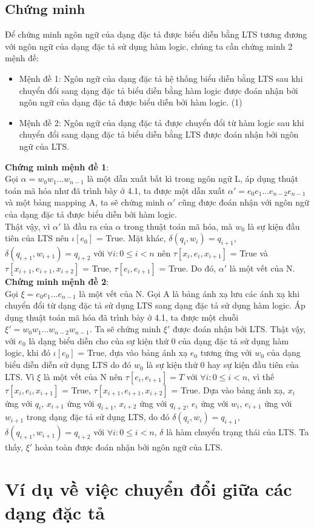 \documentclass[a4paper,13pt,oneside,openany]{book}
\begin{document}
\begin{flushleft}
		\section{Chứng minh}
		Để chứng minh ngôn ngữ của dạng đặc tả được biểu diễn bằng LTS tương đương với ngôn ngữ của dạng đặc tả sử dụng hàm logic, chúng ta cần chứng minh 2 mệnh đề:
		\begin{itemize}
			\item Mệnh đề 1: Ngôn ngữ của dạng đặc tả hệ thống biểu diễn bằng LTS sau khi chuyển đổi sang dạng đặc tả biểu diễn bằng hàm logic được đoán nhận bởi ngôn ngữ của dạng đặc tả được biểu diễn bởi hàm logic. (1)\\
			\item Mệnh đề 2: Ngôn ngữ của dạng đặc tả được chuyển đổi từ hàm logic sau khi chuyển đổi sang dạng đặc tả biểu diễn bằng LTS được đoán nhận bởi ngôn ngữ của LTS.
		\end{itemize}
		\textbf{Chứng minh mệnh đề 1}:\\
		Gọi $\alpha = w_0w_1...w_{n-1}$ là một dẫn xuất bất kì trong ngôn ngữ L, áp dụng thuật toán mã hóa như đã trình bày ở 4.1, ta được một dẫn xuất $\alpha' = e_0e_1...e_{n-2}e_{n-1}$ và một bảng mapping A, ta sẽ chứng minh $\alpha'$ cũng được đoán nhận với ngôn ngữ của dạng đặc tả được biểu diễn bởi hàm logic.\\
		Thật vậy, vì $\alpha'$ là đầu ra của $\alpha$ trong thuật toán mã hóa, mà $w_{0}$ là sự kiện đầu tiên của LTS nên $\iota[e_0]$ = True. Mặt khác, $\delta(q_i, w_i) = q_{i+1}$, $\delta(q_{i+1}, w_{i+1}) = q_{i+2}$ với $\forall i: 0 \leq i < n$ nên $\tau[x_i, e_i, x_{i+1}]$ = True và $\tau[x_{i+1}, e_{i+1}, x_{i+2}]$ = True, $\tau[e_i, e_{i+1}]$ = True. Do đó, $\alpha'$ là một vết của N.\\
		\textbf{Chứng minh mệnh đề 2}:\\
		Gọi $\xi = e_0e_1...e_{n-1}$ là một vết của N. Gọi A là bảng ánh xạ lưu các ánh xạ khi chuyển đổi từ dạng đặc tả sử dụng LTS sang dạng đặc tả sử dụng hàm logic. Áp dụng thuật toán mã hóa đã trình bày ở 4.1, ta được một chuỗi $\xi' = w_0w_1...w_{n-2}w_{n-1}$. Ta sẽ chứng minh $\xi'$ được đoán nhận bởi LTS. Thật vậy, với $e_0$ là dạng biểu diễn cho của sự kiện thứ 0 của dạng đặc tả sử dụng hàm logic, khi đó $\iota[e_0]$ = True, dựa vào bảng ánh xạ $e_0$ tương ứng với  $w_{0}$ của dạng biểu diễn diễn sử dụng LTS do đó $w_{0}$ là sự kiện thứ 0 hay sự kiện đầu tiên của LTS. Vì $\xi$ là một vết của N nên $\tau[e_i,e_{i+1}] = T$ với $\forall i: 0 \leq i < n$, vì thế $\tau[x_i, e_i, x_{i+1}]$ = True, $\tau[x_{i+1}, e_{i+1}, x_{i+2}]$ = True. Dựa vào bảng ánh xạ, $x_i$ ứng với $q_i$, $x_{i+1}$ ứng với $q_{i+1}$, $x_{i+2}$ ứng với $q_{i+2}$, $e_i$ ứng với $w_i$, $e_{i+1}$ ứng với $w_{i+1}$ trong dạng đặc tả sử dụng LTS, do đó $\delta(q_{i}, w_{i}) = q_{i+1}$, $\delta(q_{i+1}, w_{i+1}) = q_{i+2}$ với $\forall i: 0 \leq i < n$, $\delta$ là hàm chuyển trạng thái của LTS. Ta thấy, $\xi'$ hoàn toàn được đoán nhận bởi ngôn ngữ của LTS.
	\chapter{Ví dụ về việc chuyển đổi giữa các dạng đặc tả}
	\end{flushleft}
\end{document}
